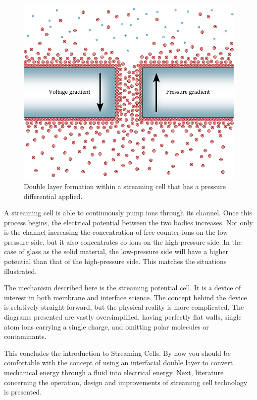     \begin{figure}[ht]
        \centering
        \includegraphics{content/pt1/01-PowerHarvesting/graphics/intro_2_channel}
        \caption{\label{fig:doubleLayerInChannel_withPressure}Double layer formation within a streaming cell that has a pressure differential applied.}
    \end{figure}

    A streaming cell is able to continuously pump ions through its channel.
    Once this process begins, the electrical potential between the two bodies increases.
    Not only is the channel increasing the concentration of free counter ions on the low-pressure side, but it also concentrates co-ions on the high-pressure side.
    In the case of glass as the solid material, the low-pressure side will have a higher potential than that of the high-pressure side.
    This matches the situations illustrated.

    The mechanism described here is the streaming potential cell.
    It is a device of interest in both membrane and interface science.
    The concept behind the device is relatively straight-forward, but the physical reality is more complicated.
    The diagrams presented are vastly oversimplified, having perfectly flat walls, single atom ions carrying a single charge, and omitting polar molecules or contaminants.

    This concludes the introduction to Streaming Cells.
    By now you should be comfortable with the concept of using an interfacial double layer to convert mechanical energy through a fluid into electrical energy.
    Next, literature concerning the operation, design and improvements of streaming cell technology is presented.

